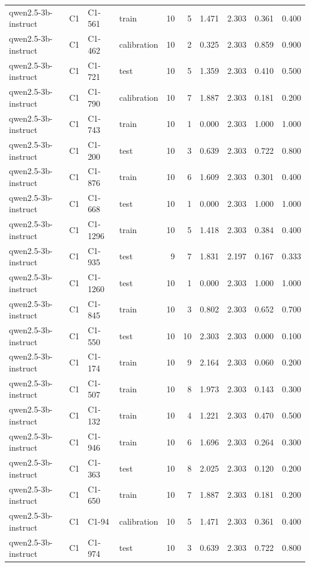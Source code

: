 \begin{table}
\begin{tabular}{llllrrrrrr}
qwen2.5-3b-instruct & C1 & C1-561 & train & 10 & 5 & 1.471 & 2.303 & 0.361 & 0.400 \\
qwen2.5-3b-instruct & C1 & C1-462 & calibration & 10 & 2 & 0.325 & 2.303 & 0.859 & 0.900 \\
qwen2.5-3b-instruct & C1 & C1-721 & test & 10 & 5 & 1.359 & 2.303 & 0.410 & 0.500 \\
qwen2.5-3b-instruct & C1 & C1-790 & calibration & 10 & 7 & 1.887 & 2.303 & 0.181 & 0.200 \\
qwen2.5-3b-instruct & C1 & C1-743 & train & 10 & 1 & 0.000 & 2.303 & 1.000 & 1.000 \\
qwen2.5-3b-instruct & C1 & C1-200 & test & 10 & 3 & 0.639 & 2.303 & 0.722 & 0.800 \\
qwen2.5-3b-instruct & C1 & C1-876 & train & 10 & 6 & 1.609 & 2.303 & 0.301 & 0.400 \\
qwen2.5-3b-instruct & C1 & C1-668 & test & 10 & 1 & 0.000 & 2.303 & 1.000 & 1.000 \\
qwen2.5-3b-instruct & C1 & C1-1296 & train & 10 & 5 & 1.418 & 2.303 & 0.384 & 0.400 \\
qwen2.5-3b-instruct & C1 & C1-935 & test & 9 & 7 & 1.831 & 2.197 & 0.167 & 0.333 \\
qwen2.5-3b-instruct & C1 & C1-1260 & test & 10 & 1 & 0.000 & 2.303 & 1.000 & 1.000 \\
qwen2.5-3b-instruct & C1 & C1-845 & train & 10 & 3 & 0.802 & 2.303 & 0.652 & 0.700 \\
qwen2.5-3b-instruct & C1 & C1-550 & test & 10 & 10 & 2.303 & 2.303 & 0.000 & 0.100 \\
qwen2.5-3b-instruct & C1 & C1-174 & train & 10 & 9 & 2.164 & 2.303 & 0.060 & 0.200 \\
qwen2.5-3b-instruct & C1 & C1-507 & train & 10 & 8 & 1.973 & 2.303 & 0.143 & 0.300 \\
qwen2.5-3b-instruct & C1 & C1-132 & train & 10 & 4 & 1.221 & 2.303 & 0.470 & 0.500 \\
qwen2.5-3b-instruct & C1 & C1-946 & train & 10 & 6 & 1.696 & 2.303 & 0.264 & 0.300 \\
qwen2.5-3b-instruct & C1 & C1-363 & test & 10 & 8 & 2.025 & 2.303 & 0.120 & 0.200 \\
qwen2.5-3b-instruct & C1 & C1-650 & train & 10 & 7 & 1.887 & 2.303 & 0.181 & 0.200 \\
qwen2.5-3b-instruct & C1 & C1-94 & calibration & 10 & 5 & 1.471 & 2.303 & 0.361 & 0.400 \\
qwen2.5-3b-instruct & C1 & C1-974 & test & 10 & 3 & 0.639 & 2.303 & 0.722 & 0.800 \\

\end{tabular}
\end{table}
